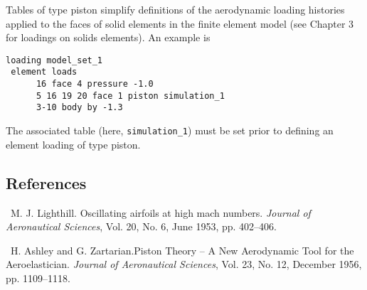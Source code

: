 \documentclass[11pt]{report}
\numberwithin{equation}{section}
\newcommand{\ti}{\emph}
\newcommand{\noi}{\noindent}
\newcounter{sectrefs}
\begin{document}
Tables of type piston simplify definitions of the aerodynamic
loading histories applied to the faces of solid elements in the finite element model 
(see Chapter 3 for loadings on solids elements). An example is
\small
\begin{verbatim}
loading model_set_1  
 element loads
      16 face 4 pressure -1.0
      5 16 19 20 face 1 piston simulation_1
      3-10 body by -1.3
\end{verbatim}
\normalsize
\noi The associated table (here, \verb+simulation_1+) must be set 
prior to defining an element loading of type piston. 

\subsection {References}
\small
{}~M. J. Lighthill.
Oscillating airfoils at high mach numbers. \ti{Journal of Aeronautical Sciences}, 
Vol. 20, No. 6, June 1953, pp. 402--406. 
\medskip

~H. Ashley and G. 
Zartarian.Piston Theory -- A New Aerodynamic Tool for the Aeroelastician.
\ti{Journal of Aeronautical Sciences}, Vol. 23, No. 12, December 1956, pp. 1109--1118.
\end{document}
